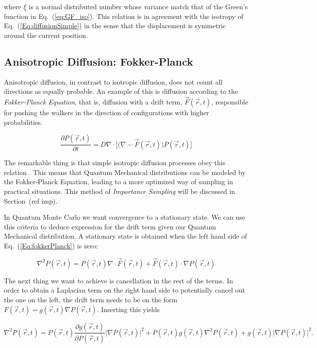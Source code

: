 where $\xi$ is a normal distributed number whose variance match that of the Green's function in Eq.~(\ref{eq:GF_iso}). This relation is in agreement with the isotropy of Eq.~(\ref{Eq:diffusionSimple}) in the sense that the displacement is symmetric around the current position.


\subsection{Anisotropic Diffusion: Fokker-Planck}

Anisotropic diffusion, in contrast to isotropic diffusion, does not count all directions as equally probable. An example of this is diffusion according to the \textit{Fokker-Planck Equation}, that is, diffusion with a drift term, $\vec F(\vec r, t)$, responsible for pushing the walkers in the direction of configurations with higher probabilities.

\begin{equation}
 \label{Eq:fokkerPlanck}
 \frac{\partial P(\vec r, t)}{\partial t} = D\nabla\cdot\Big[\Big(\nabla - \vec F(\vec r, t)\Big) P(\vec r, t)\Big] 
\end{equation}

The remarkable thing is that simple isotropic diffusion processes obey this relation \cite{abInitioMC}. This means that Quantum Mechanical distributions can be modeled by the Fokker-Planck Equation, leading to a more optimized way of sampling in practical situations. This method of \textit{Importance Sampling} will be discussed in Section~(ref imp). 

In Quantum Monte Carlo we want convergence to a stationary state. We can use this criteria to deduce expression for the drift term given our Quantum Mechanical distribution. A stationary state is obtained when the left hand side of Eq.~(\ref{Eq:fokkerPlanck}) is zero:

\begin{equation*}
 \nabla^2 P(\vec r, t) = P(\vec r, t)\nabla\cdot\vec F(\vec r, t) + \vec F(\vec r, t) \cdot \nabla P(\vec r, t)
\end{equation*}

The next thing we want to achieve is cancellation in the rest of the terms. In order to obtain a Laplacian term on the right hand side to potentially cancel out the one on the left, the drift term needs to be on the form $F(\vec r, t) = g(\vec r, t)\nabla P(\vec r, t)$. Inserting this yields

\begin{equation*}
  \nabla^2 P(\vec r, t) = P(\vec r, t)\frac{\partial g(\vec r, t)}{\partial P(\vec r, t)}\Big|\nabla P(\vec r, t)\Big|^2
  + P(\vec r, t)g(\vec r, t)\nabla^2 P(\vec r, t) + g(\vec r, t) \Big|\nabla P(\vec r, t)\Big|^2.
\end{equation*}

